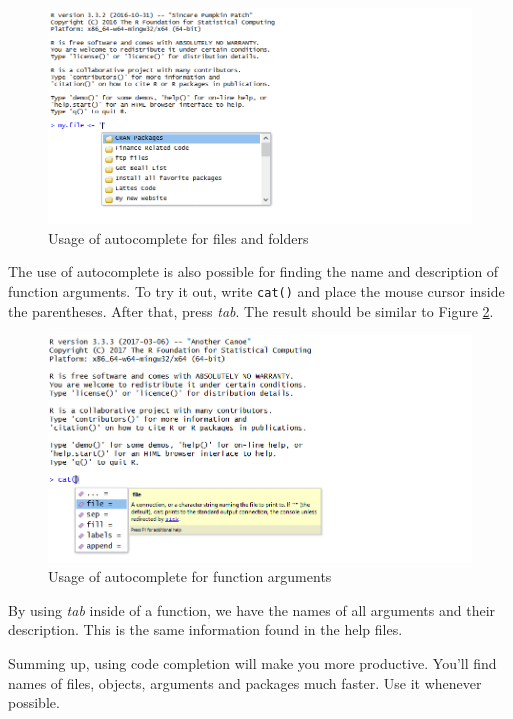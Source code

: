 \documentclass[11pt,]{book}
\begin{document}
\begin{figure}[!htbp]

{\centering \includegraphics[width=1\linewidth]{figs/autocomplete_arquivos} 

}

\caption{Usage of autocomplete for files and folders}\label{fig:autocomplete-files}
\end{figure}

The use of autocomplete is also possible for finding the name and
description of function arguments. To try it out, write \texttt{cat()}
and place the mouse cursor inside the parentheses. After that, press
\emph{tab}. The result should be similar to Figure
\ref{fig:autocomplete-args}.

\begin{figure}[!htbp]

{\centering \includegraphics[width=0.75\linewidth]{figs/autocomplete_args} 

}

\caption{Usage of autocomplete for function arguments}\label{fig:autocomplete-args}
\end{figure}

By using \emph{tab} inside of a function, we have the names of all
arguments and their description. This is the same information found in
the help files.

Summing up, using code completion will make you more productive. You'll
find names of files, objects, arguments and packages much faster. Use it
whenever possible.
\end{document}
